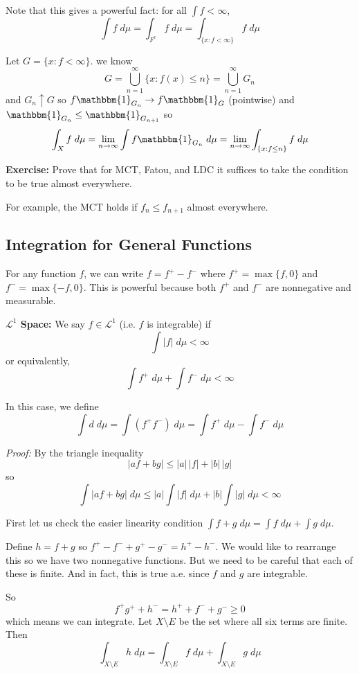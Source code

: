 \documentclass[12pt]{report}
\newcommand{\R}{\mathbb{R}}
\newcommand{\ind}{\mathbbm{1}}
\newcommand{\abs}[1]{\left\vert #1 \right\vert}
\renewcommand{\L}{\mathcal{L}}
\newcommand*{\tbf}[1]{\ifmmode\mathbf{#1}\else\textbf{#1}\fi}
\newenvironment*{tbox}[2][gray]{
    \begin{tcolorbox}[
        parbox=false,
        colback=#1!5!white,
        colframe=#1!75!black,
        breakable,
        title={#2}
    ]}
    {\end{tcolorbox}}
\newenvironment*{exercise}[1][red]{
    \begin{tcolorbox}[
        parbox=false,
        colback=#1!5!white,
        colframe=#1!75!black,
        breakable
    ]}
    {\end{tcolorbox}}
\begin{document}
    Note that this gives a powerful fact: for all $\int f < \infty$, 
    \[\int f\; d\mu = \int_{F^c} f\; d\mu = \int_{\{x: f< \infty\}} f\; d\mu\]

    Let $G = \{x: f < \infty\}$. we know
    \[G = \bigcup_{n=1}^\infty \{x: f(x) \leq n\} = \bigcup_{n=1}^\infty G_n\] 
    and $G_n \uparrow G$ so $f \ind_{G_n} \to f\ind_G$ (pointwise) and $\ind_{G_n} \leq \ind_{G_{n+1}}$ so 
    \[\int_X f \; d\mu = \lim_{n \to \infty} \int f \ind_{G_n} \; d\mu = \lim_{n \to \infty} \int_{\{x: f\leq n\}} f\; d\mu\]

    \begin{exercise}
        \textbf{Exercise:} Prove that for MCT, Fatou, and LDC it suffices to take the condition to be true almost everywhere. 

        For example, the MCT holds if $f_n \leq f_{n+1}$ almost everywhere. 
    \end{exercise}

\subsection*{Integration for General Functions} 
    For any function $f$, we can write $f = f^+ - f^-$ where $f^+ = \max\{f, 0\}$ and $f^- = \max\{-f, 0\}$. This is powerful because both $f^+$ and $f^-$ are nonnegative and measurable. 

    \tbf{$\L^1$ Space:} We say $f \in \L^1$ (i.e. $f$ is integrable) if 
    \[\int \abs f \; d\mu < \infty\]
    or equivalently, 
    \[\int f^+ \; d\mu + \int f^- \; d\mu < \infty\] 
    
    In this case, we define 
    \[\int d \; d\mu = \int(f^+  f^-) \; d\mu = \int f^+ \; d\mu - \int f^- \; d\mu\]

    \begin{tbox}{\textbf{Proposition:} If $f, g \in \L^1$ and $a, b \in \R$, then 
        \begin{enumerate}
            \item $af+ bg \in \L^1$
            \item $\int af + bg \; d\mu = a\int f \; d\mu + b\int g \; d\mu$
        \end{enumerate} }
        \emph{Proof:} By the triangle inequality 
        \[\abs{af  +bg} \leq \abs{a}\, \abs{f} + \abs{b}\, \abs{g}\]
        so 
        \[\int \abs{af + bg} \; d\mu \leq \abs{a} \int \abs{f} \; d\mu + \abs{b} \int \abs{g} \; d\mu < \infty\]

        First let us check the easier linearity condition $\int f + g\; d\mu = \int f\; d\mu + \int g\; d\mu$. 

        Define $h = f + g$ so $f^+ - f^- + g^+ - g^- = h^+ - h^-$. We would like to rearrange this so we have two nonnegative functions. But we need to be careful that each of these is finite. And in fact, this is true a.e. since $f$ and $g$ are integrable.

        So 
        \[f^+ g^+ + h^- = h^+ + f^- + g^- \geq 0\]
        which means we can integrate. Let $X \setminus E$ be the set where all six terms are finite. Then 
        \[\int_{X \setminus E} h \; d\mu = \int_{X \setminus E} f\; d\mu + \int_{X \setminus E} g\; d\mu\]
    \end{tbox}
\end{document}
